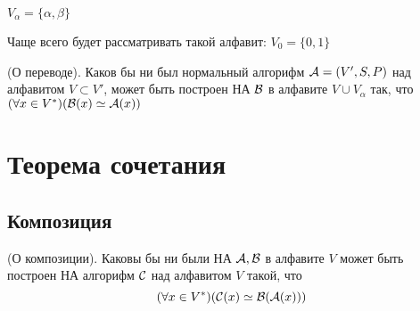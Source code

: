 

\title{}
\author{Козырнов Александр Дмитриевич, ИУ7-32Б}
\date{\today}


$V_{\alpha} = \{\alpha,\beta\} $ 

Чаще всего будет рассматривать такой алфавит: $V_0=\{0,1\} $ 

\medskip

\begin{theorem}
    (О переводе). Каков бы ни был нормальный алгорифм $ {\cal A} = (V',S,P)$
    над алфавитом $V \subset V'$, может быть построен НА $ {\cal B}$ в алфавите $V \cup V_{\alpha}$
    так, что $(\forall x \in V^{*})( {\cal B}(x) \simeq {\cal A}(x))$
\end{theorem}

\section{Теорема сочетания}
\subsection{Композиция}


\begin{theorem}
    (О композиции). Каковы бы ни были НА $ {\cal A, B}$ в алфавите $V$ может быть построен
    НА алгорифм  $ {\cal C}$ над алфавитом $V$ такой, что 
    \[
        (\forall x \in V^{*})( {\cal C}(x) \simeq {\cal B}( {\cal A}(x) ) )
    \] 
\end{theorem}

